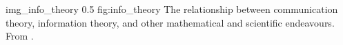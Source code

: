 \begin{myfig}
    {img_info_theory} %
    {0.5} %
    {fig:info_theory} %
    {The relationship between communication theory, information theory, and other mathematical and scientific endeavours.
    From \citet[p. 2, fig. 1.1]{cover2006elements}.
    } %
\end{myfig}